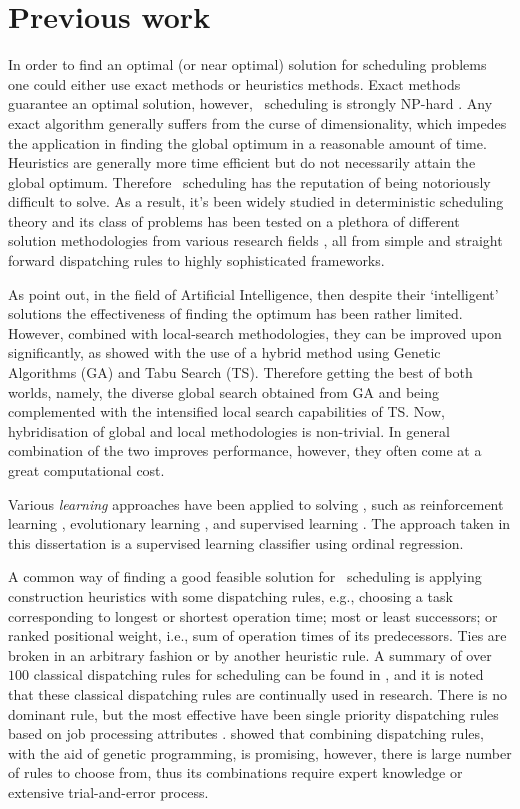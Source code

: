\section{Previous work}
In order to find an optimal (or near optimal) solution for scheduling problems one could either use exact methods or heuristics methods. Exact methods guarantee an optimal solution, however, \jsp\ scheduling is strongly NP-hard \citep{Garey76:NPhard}. Any exact algorithm generally suffers from the curse of dimensionality, which impedes the application in finding the global optimum in a reasonable amount of time. Heuristics are generally more time efficient but do not necessarily attain the global optimum. Therefore \jsp\ scheduling 
has the reputation of being notoriously difficult to solve. As a result, it's been widely studied in deterministic scheduling theory and its class of problems has been tested on a plethora of different solution methodologies from various research fields \citep{Meeran12}, all from simple and straight forward dispatching rules to highly sophisticated frameworks.

As \cite{Meeran12} point out, in the field of Artificial Intelligence, then despite their `intelligent' solutions the effectiveness of finding the optimum has been rather limited. However, combined with local-search methodologies, they can be improved upon significantly, as \citeauthor{Meeran12} showed with the use of a hybrid method using Genetic Algorithms (GA) and Tabu Search (TS). Therefore getting the best of both worlds, namely, the diverse global search obtained from GA and being complemented with the intensified local search capabilities of TS. Now, hybridisation of global and local methodologies is non-trivial. In general combination of the two improves performance, however, they often come at a great computational cost.  

Various \emph{learning} approaches have been applied to solving \jsp, such as reinforcement learning \citep{Zhang95}, evolutionary learning \citep{Tay08}, and supervised learning \citep{Siggi05,Malik08}. The approach taken in this dissertation is a supervised learning classifier using ordinal regression. 


A common way of finding a good feasible solution for \jsp\ scheduling is applying construction heuristics with some dispatching rules, e.g., choosing a task corresponding to longest or shortest operation time; most or least successors; or ranked positional weight, i.e., sum of operation times of its predecessors. Ties are broken in an arbitrary fashion or by another heuristic rule.
A summary of over $100$ classical dispatching rules for scheduling can be found in \citet{Panwalkar77}, and it is noted that these classical dispatching rules are continually used in research.  
There is no dominant rule, but the most effective have been single priority dispatching rules based on job processing attributes \citep{Haupt89}. \citet{Tay08} showed that combining dispatching rules, with the aid of genetic programming, is promising, however, there is large number of rules to choose from, thus its combinations require expert knowledge or extensive trial-and-error process. 

